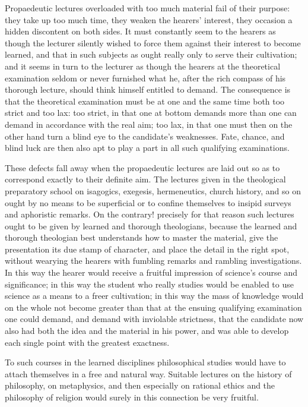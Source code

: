 \documentclass[12pt,a4paper]{book}
\begin{document}
Propaedeutic lectures overloaded with too much material fail of their purpose: they take up too much
time, they
weaken the hearers' interest, they occasion a hidden discontent on both sides. It must constantly seem
to the hearers as though the lecturer silently wished to force them against their interest to become
learned, and that in such subjects as ought really only to serve their cultivation; and it seems in turn
to the lecturer as though the hearers at the theoretical examination seldom or never furnished what he,
after the rich compass of his thorough lecture, should think himself entitled to demand. The consequence
is that the theoretical examination must be at one and the same time both too strict and too lax: too
strict, in that one at bottom demands more than one can demand in accordance with the real aim; too lax,
in that one must then on the other hand turn a blind eye to the candidate's weaknesses. Fate, chance,
and blind luck are then also apt to play a part in all such qualifying examinations.

These defects fall away when the propaedeutic lectures are laid out so as to correspond exactly to their
definite aim. The lectures given in the theological preparatory school on isagogics, exegesis,
hermeneutics, church history, and so on ought by no means to be superficial or to confine themselves to
insipid surveys and aphoristic remarks. On the contrary! precisely for that reason such lectures ought to
be given by learned and thorough theologians, because the learned and thorough theologian best
understands how to master the material, give the presentation its due stamp of character, and place the
detail in the right spot, without wearying the hearers with fumbling remarks and rambling investigations.
In this way the hearer would receive a fruitful impression of science's course and significance; in this
way the student who really studies would be enabled to use science as a means to a freer cultivation; in
this way the mass of knowledge would on the whole not become greater than that at the ensuing
qualifying examination one could demand, and demand with inviolable strictness, that the candidate now
also had both the idea and the material in his power, and was able to develop each single point with the
greatest exactness.

To such courses in the learned disciplines philosophical studies would have to attach themselves in a
free and natural way. Suitable lectures on the history of philosophy, on metaphysics, and then
especially on rational ethics and the philosophy of religion would surely in this connection be very
fruitful.
\end{document}
